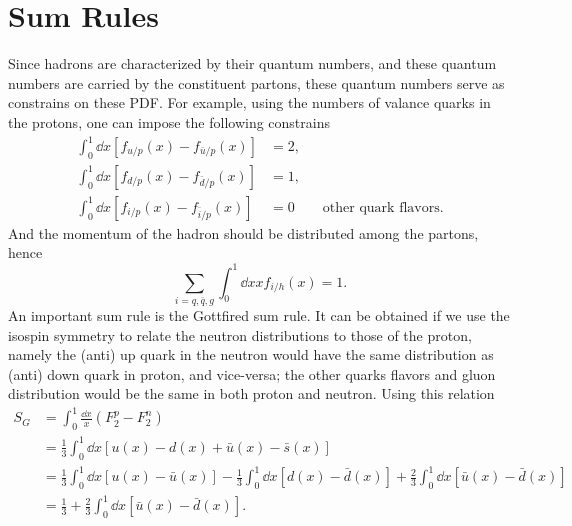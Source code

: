 \section{Sum Rules}
\label{sec:sum_rules}
Since hadrons are characterized by their quantum numbers, and these quantum numbers 
are carried by the constituent partons, these quantum numbers serve as constrains
on these PDF. For example, using the numbers of valance quarks in the protons, 
one can impose the following constrains
\begin{equation}
\begin{split}
	\int_{0}^{1} \dd{x} \left[f_{u/p} \left(x\right)-f_{\bar{u}/p} \left(x\right)\right]&=2,\\
	\int_{0}^{1} \dd{x} \left[f_{d/p} \left(x\right)-f_{\bar{d}/p} \left(x\right)\right]&=1,\\
	\int_{0}^{1} \dd{x} \left[f_{i/p} \left(x\right)-f_{\bar{i}/p} \left(x\right)\right]&=0 \qquad \text{other quark flavors}.
\end{split}
\end{equation}
And the momentum of the hadron should be distributed among the partons, hence
\begin{equation}
	\sum_{i=q,\bar{q},g}\int_{0}^{1} \dd{x} xf_{i/h}\left(x\right)=1.
\end{equation}
An important sum rule is the Gottfired sum rule\cite{gottfried1967}. It can be obtained
if we use the isospin symmetry to relate the neutron distributions to those of 
the proton, namely the (anti) up quark in the neutron would have the same distribution 
as (anti) down quark in proton, and vice-versa; the other quarks flavors and gluon
distribution would be the same in both proton and neutron. Using this relation
\begin{equation}
\begin{split}
	S_G & = \int_0^1 \frac{\dd{x}}{x}\left(F_2^{p} - F_{2}^{n}\right)\\
	    & = \frac{1}{3} \int_0^1 \dd{x} \left[u\left(x\right) - d\left(x\right) 
			+ \bar{u}\left(x\right) - \bar{s}\left(x\right)\right]\\
		& = \frac{1}{3} \int_0^1 \dd{x} \left[u\left(x\right) - \bar{u}\left(x\right)\right]
			- \frac{1}{3} \int_0^1 \dd{x} \left[d\left(x\right) - \bar{d}\left(x\right)\right]
			+ \frac{2}{3} \int_0^1 \dd{x} \left[\bar{u}\left(x\right)-\bar{d}\left(x\right)\right]\\
		& = \frac{1}{3} + \frac{2}{3} \int_0^1 \dd{x} \left[\bar{u}\left(x\right)-\bar{d}\left(x\right)\right]. 
\end{split}
\end{equation}
